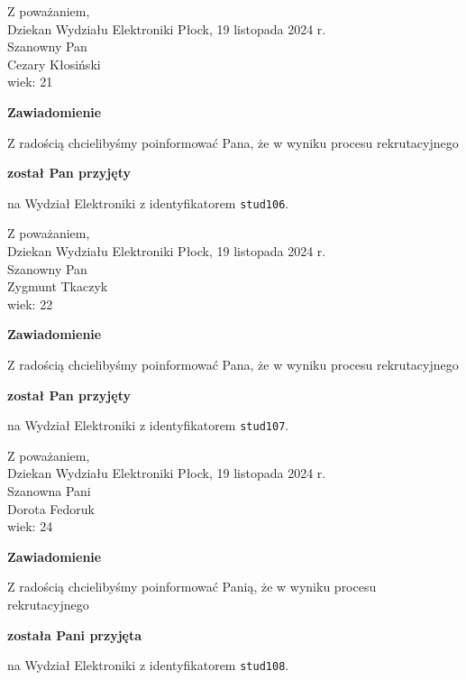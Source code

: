 \documentclass[12pt,a4paper]{article}
\begin{document}
\noindent
Z poważaniem,\\
Dziekan
Wydziału Elektroniki
\newpage
\hfill Płock, 19 listopada 2024 r.\\ 
\noindent 
Szanowny Pan \\
Cezary Kłosiński \\
wiek: 21

\bigskip

\begin{center}
{\Large\textbf{Zawiadomienie}}
\end{center}
\bigskip
Z radością chcielibyśmy poinformować Pana, że w wyniku procesu rekrutacyjnego
\begin{center}
\textsf{\textbf{został Pan przyjęty}} 
\end{center}
na Wydział Elektroniki z identyfikatorem \verb|stud106|.
\vspace{2cm}

\noindent
Z poważaniem,\\
Dziekan
Wydziału Elektroniki
\newpage
\hfill Płock, 19 listopada 2024 r.\\ 
\noindent 
Szanowny Pan \\
Zygmunt Tkaczyk \\
wiek: 22

\bigskip

\begin{center}
{\Large\textbf{Zawiadomienie}}
\end{center}
\bigskip
Z radością chcielibyśmy poinformować Pana, że w wyniku procesu rekrutacyjnego
\begin{center}
\textsf{\textbf{został Pan przyjęty}} 
\end{center}
na Wydział Elektroniki z identyfikatorem \verb|stud107|.
\vspace{2cm}

\noindent
Z poważaniem,\\
Dziekan
Wydziału Elektroniki
\newpage
\hfill Płock, 19 listopada 2024 r.\\ 
\noindent 
Szanowna Pani \\
Dorota Fedoruk \\
wiek: 24

\bigskip

\begin{center}
{\Large\textbf{Zawiadomienie}}
\end{center}
\bigskip
Z radością chcielibyśmy poinformować Panią, że w wyniku procesu rekrutacyjnego
\begin{center}
\textsf{\textbf{została Pani przyjęta}} 
\end{center}
na Wydział Elektroniki z identyfikatorem \verb|stud108|.
\vspace{2cm}
\end{document}
